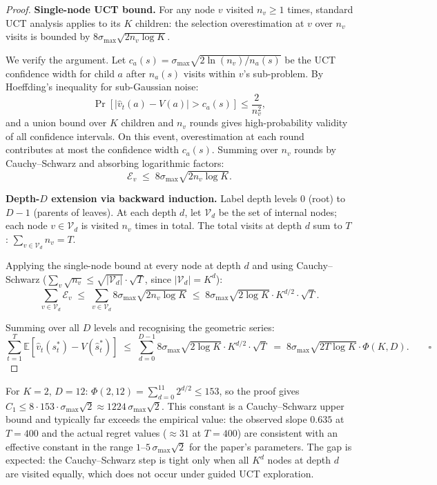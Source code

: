 \begin{proof}
\textbf{Single-node UCT bound.}
For any node $v$ visited $n_v \geq 1$ times, standard UCT analysis applies to its $K$
children: the selection overestimation at $v$ over $n_v$ visits is bounded by
$8\sigma_{\max}\sqrt{2 n_v \log K}$.

We verify the argument.  Let $c_a(s) = \sigma_{\max}\sqrt{2\ln(n_v)/n_a(s)}$ be the UCT
confidence width for child $a$ after $n_a(s)$ visits within $v$'s sub-problem.
By Hoeffding's inequality for sub-Gaussian noise:
\[
  \Pr\!\left[|\hat{v}_t(a) - V(a)| > c_a(s)\right] \leq \frac{2}{n_v^2},
\]
and a union bound over $K$ children and $n_v$ rounds gives high-probability validity
of all confidence intervals.  On this event, overestimation at each round contributes
at most the confidence width $c_{a}(s)$.  Summing over $n_v$ rounds by Cauchy--Schwarz
and absorbing logarithmic factors:
\[
  \mathcal{E}_v \;\leq\; 8\sigma_{\max}\sqrt{2 n_v \log K}.
\]

\textbf{Depth-$D$ extension via backward induction.}
Label depth levels $0$ (root) to $D-1$ (parents of leaves).  At each depth $d$, let
$\mathcal{V}_d$ be the set of internal nodes; each node $v \in \mathcal{V}_d$ is
visited $n_v$ times in total.  The total visits at depth $d$ sum to $T$:
$\sum_{v \in \mathcal{V}_d} n_v = T$.

Applying the single-node bound at every node at depth $d$ and using
Cauchy--Schwarz ($\sum_v \sqrt{n_v} \leq \sqrt{|\mathcal{V}_d|} \cdot \sqrt{T}$,
since $|\mathcal{V}_d| = K^d$):
\[
  \sum_{v \in \mathcal{V}_d} \mathcal{E}_v
  \;\leq\; \sum_{v \in \mathcal{V}_d} 8\sigma_{\max}\sqrt{2 n_v \log K}
  \;\leq\; 8\sigma_{\max}\sqrt{2\log K} \cdot K^{d/2} \cdot \sqrt{T}.
\]

Summing over all $D$ levels and recognising the geometric series:
\[
  \sum_{t=1}^T \mathbb{E}\!\left[\hat{v}_t(s^*_t) - V(\hat{s}^*_t)\right]
  \;\leq\; \sum_{d=0}^{D-1} 8\sigma_{\max}\sqrt{2\log K} \cdot K^{d/2} \cdot \sqrt{T}
  \;=\; 8\sigma_{\max}\sqrt{2T\log K} \cdot \Phi(K,D). \qquad\square
\]
\end{proof}

\begin{remark}
\label{rem:tree_depth}
For $K{=}2$, $D{=}12$: $\Phi(2,12) = \sum_{d=0}^{11}2^{d/2} \leq 153$, so the proof
gives $C_1 \leq 8 \cdot 153 \cdot \sigma_{\max}\sqrt{2} \approx 1224\,\sigma_{\max}\sqrt{2}$.
This constant is a Cauchy--Schwarz upper bound and typically
far exceeds the empirical value: the observed slope $0.635$ at $T{=}400$
and the actual regret values ($\approx 31$ at $T{=}400$)
are consistent with an effective constant in the range $1$--$5\,\sigma_{\max}\sqrt{2}$
for the paper's parameters.  The gap is expected: the Cauchy--Schwarz step is tight
only when all $K^d$ nodes at depth $d$ are visited equally, which does not occur
under guided UCT exploration.
\end{remark}

